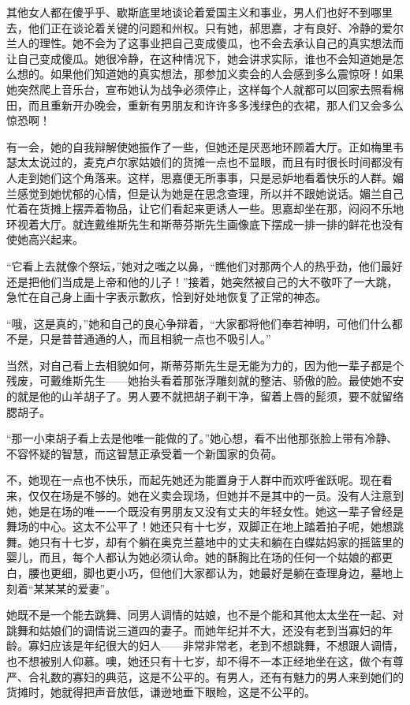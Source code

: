 \par 其他女人都在傻乎乎、歇斯底里地谈论着爱国主义和事业，男人们也好不到哪里去，他们正在谈论着关键的问题和州权。只有她，郝思嘉，才有良好、冷静的爱尔兰人的理性。她不会为了这事业把自己变成傻瓜，也不会去承认自己的真实想法而让自己变成傻瓜。她很冷静，在这种情况下，她会讲求实际，谁也不会知道她是怎么想的。如果他们知道她的真实想法，那参加义卖会的人会感到多么震惊呀！如果她突然爬上音乐台，宣布她认为战争必须停止，这样每个人就都可以回家去照看棉田，而且重新开办晚会，重新有男朋友和许许多多浅绿色的衣裙，那人们又会多么惊恐啊！
\par 有一会，她的自我辩解使她振作了一些，但她还是厌恶地环顾着大厅。正如梅里韦瑟太太说过的，麦克卢尔家姑娘们的货摊一点也不显眼，而且有时很长时间都没有人走到她们这个角落来。这样，思嘉便无所事事，只是忌妒地看着快乐的人群。媚兰感觉到她忧郁的心情，但是认为她是在思念查理，所以并不跟她说话。媚兰自己忙着在货摊上摆弄着物品，让它们看起来更诱人一些。思嘉却坐在那，闷闷不乐地环视着大厅。就连戴维斯先生和斯蒂芬斯先生画像底下摆成一排一排的鲜花也没有使她高兴起来。
\par “它看上去就像个祭坛，”她对之嗤之以鼻，“瞧他们对那两个人的热乎劲，他们最好还是把他们当成是上帝和他的儿子！”接着，她突然被自己的大不敬吓了一大跳，急忙在自己身上画十字表示歉疚，恰到好处地恢复了正常的神态。
\par “哦，这是真的，”她和自己的良心争辩着，“大家都将他们奉若神明，可他们什么都不是，只是普普通通的人，而且相貌一点也不吸引人。”
\par 当然，对自己看上去相貌如何，斯蒂芬斯先生是无能为力的，因为他一辈子都是个残废，可戴维斯先生——她抬头看着那张浮雕刻就的整洁、骄傲的脸。最使她不安的就是他的山羊胡子了。男人要不就把胡子剃干净，留着上唇的髭须，要不就留络腮胡子。
\par “那一小束胡子看上去是他唯一能做的了。”她心想，看不出他那张脸上带有冷静、不容怀疑的智慧，而这智慧正承受着一个新国家的负荷。
\par 不，她现在一点也不快乐，而起先她还为能置身于人群中而欢呼雀跃呢。现在看来，仅仅在场是不够的。她在义卖会现场，但她并不是其中的一员。没有人注意到她，她是在场的唯一一个既没有男朋友又没有丈夫的年轻女性。她这一辈子曾经是舞场的中心。这太不公平了！她还只有十七岁，双脚正在地上踏着拍子呢，她想跳舞。她只有十七岁，却有个躺在奥克兰墓地中的丈夫和躺在白蝶姑妈家的摇篮里的婴儿，而且，每个人都认为她必须认命。她的酥胸比在场的任何一个姑娘的都更白，腰也更细，脚也更小巧，但他们大家都认为，她最好是躺在查理身边，墓地上刻着“某某某的爱妻”。
\par 她既不是一个能去跳舞、同男人调情的姑娘，也不是个能和其他太太坐在一起、对跳舞和姑娘们的调情说三道四的妻子。而她年纪并不大，还没有老到当寡妇的年龄。寡妇应该是年纪很大的妇人——非常非常老，老到不想跳舞，不想跟人调情，也不想被别人仰慕。噢，她还只有十七岁，却不得不一本正经地坐在这，做个有尊严、合礼数的寡妇的典范，这是不公平的。有男人，还有有魅力的男人来到她们的货摊时，她就得把声音放低，谦逊地垂下眼睑，这是不公平的。
